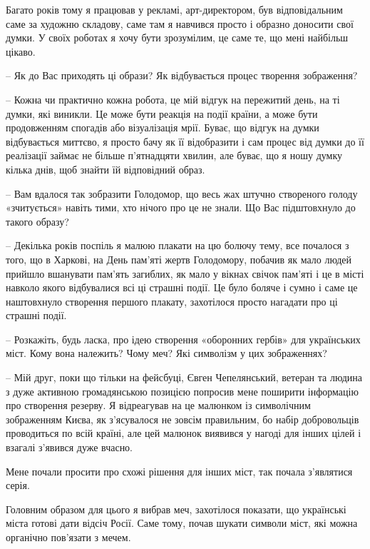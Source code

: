 Багато років тому я працював у рекламі, арт-директором, був відповідальним саме
за художню складову, саме там я навчився просто і образно доносити свої думки.
У своїх роботах я хочу бути зрозумілим, це саме те, що мені найбільш цікаво.

– Як до Вас приходять ці образи? Як відбувається процес творення зображення?

– Кожна чи практично кожна робота, це мій відгук на пережитий день, на ті
думки, які виникли. Це може бути реакція на події країни, а може бути
продовженням спогадів або візуалізація мрії. Буває, що відгук на думки
відбувається миттєво, я просто бачу як її відобразити і сам процес від думки до
її реалізації займає не більше п'ятнадцяти хвилин, але буває, що я ношу думку
кілька днів, щоб знайти їй відповідний образ.


– Вам вдалося так зобразити Голодомор, що весь жах штучно створеного голоду
«зчитується» навіть тими, хто нічого про це не знали. Що Вас підштовхнуло до
такого образу?

– Декілька років поспіль я малюю плакати на цю болючу тему, все почалося з
того, що в Харкові, на День пам'яті жертв Голодомору, побачив як мало людей
прийшло вшанувати пам'ять загиблих, як мало у вікнах свічок пам'яті і це в
місті навколо якого відбувалися всі ці страшні події. Це було боляче і сумно і
саме це наштовхнуло створення першого плакату, захотілося просто нагадати про
ці страшні події.


– Розкажіть, будь ласка, про ідею створення «оборонних гербів» для українських
міст. Кому вона належить? Чому меч? Які символізм у цих зображеннях?

– Мій друг, поки що тільки на фейсбуці, Євген Чепелянський, ветеран та людина з
дуже активною громадянською позицією попросив мене поширити інформацію про
створення резерву. Я відреагував на це малюнком із символічним зображенням
Києва, як з'ясувалося не зовсім правильним, бо набір добровольців проводиться
по всій країні, але цей малюнок виявився у нагоді для інших цілей і взагалі
з'явився дуже вчасно.

Мене почали просити про схожі рішення для інших міст, так почала з'являтися
серія.

Головним образом для цього я вибрав меч, захотілося показати, що українські
міста готові дати відсіч Росії. Саме тому, почав шукати символи міст, які можна
органічно пов'язати з мечем.


